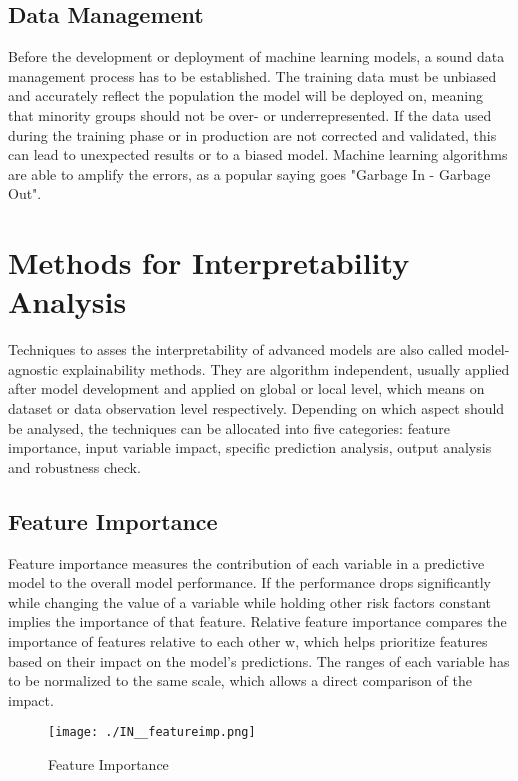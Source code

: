 \subsection{Data Management}
Before the development or deployment of machine learning models, a sound data management process has to be established. The training data must be unbiased and accurately reflect the population the model will be deployed on, meaning that minority groups should not be over- or underrepresented. If the data used during the training phase or in production are not corrected and validated, this can lead to unexpected results or to a biased model. Machine learning algorithms are able to amplify the errors, as a popular saying goes "Garbage In - Garbage Out". 

\section{Methods for Interpretability Analysis}
Techniques to asses the interpretability of advanced models are also called model-agnostic explainability methods. They are algorithm independent, usually applied after model development and applied on global or local level, which means on dataset or data observation level respectively. Depending on which aspect should be analysed, the techniques can be allocated into  
five categories: feature importance, input variable impact, specific prediction analysis, output analysis and robustness check.

\subsection{Feature Importance}
Feature importance measures the contribution of each variable in a predictive model to the overall model performance. If the performance drops significantly while changing the value of a variable while holding other risk factors constant implies the importance of that feature. Relative feature importance compares the importance of features relative to each other w, which helps prioritize features based on their impact on the model's predictions. The ranges of each variable has to be normalized to the same scale, which allows a direct comparison of the impact.

\begin{figure}[H]
	\centering
	\texttt{[image: ./IN\_\_featureimp.png]}
    \caption{Feature Importance}
    \label{fig:in_featureimp}
\end{figure}

